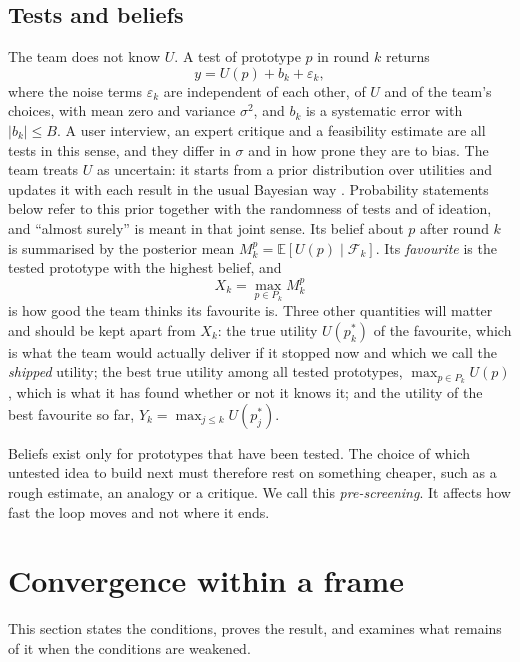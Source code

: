 \documentclass[10pt,twocolumn]{article}
\newcommand{\E}{\mathbb{E}}
\newcommand{\filt}{\mathcal{F}}
\newcommand{\Pk}{P_k}
\theoremstyle{definition}
\begin{document}
\subsection{Tests and beliefs}

The team does not know $U$. A test of prototype $p$ in round $k$ returns
\begin{equation}
\label{eq:test}
y=U(p)+b_k+\varepsilon_k ,
\end{equation}
where the noise terms $\varepsilon_k$ are independent of each other, of $U$ and of the team's choices, with mean zero and variance $\sigma^2$, and $b_k$ is a systematic error with $|b_k|\le B$. A user interview, an expert critique and a feasibility estimate are all tests in this sense, and they differ in $\sigma$ and in how prone they are to bias. The team treats $U$ as uncertain: it starts from a prior distribution over utilities and updates it with each result in the usual Bayesian way \citep{degroot2004}. Probability statements below refer to this prior together with the randomness of tests and of ideation, and ``almost surely'' is meant in that joint sense. Its belief about $p$ after round $k$ is summarised by the posterior mean $M^p_k=\E[U(p)\mid\filt_k]$. Its \emph{favourite} is the tested prototype with the highest belief, and
\begin{equation}
\label{eq:Xk}
X_k=\max_{p\in \Pk}M^p_k
\end{equation}
is how good the team thinks its favourite is. Three other quantities will matter and should be kept apart from $X_k$: the true utility $U(p^*_k)$ of the favourite, which is what the team would actually deliver if it stopped now and which we call the \emph{shipped} utility; the best true utility among all tested prototypes, $\max_{p\in\Pk}U(p)$, which is what it has found whether or not it knows it; and the utility of the best favourite so far, $Y_k=\max_{j\le k}U(p^*_j)$.

Beliefs exist only for prototypes that have been tested. The choice of which untested idea to build next must therefore rest on something cheaper, such as a rough estimate, an analogy or a critique. We call this \emph{pre-screening}. It affects how fast the loop moves and not where it ends.

\section{Convergence within a frame}
\label{sec:theory}

This section states the conditions, proves the result, and examines what remains of it when the conditions are weakened.
\end{document}

